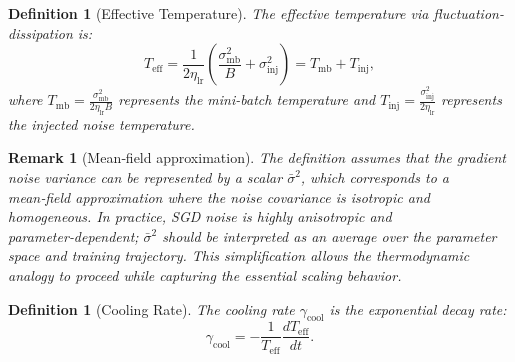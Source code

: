 \documentclass[11pt, a4paper]{article}
\newtheorem{dfn}[theo]{Definition}
\theoremstyle{plain}
\newtheorem*{remark}{Remark}
\begin{document}
\begin{dfn}[Effective Temperature]\label{dfn:teff}
The effective temperature via fluctuation-dissipation is:
\begin{equation}
T_{\text{eff}} = \frac{1}{2\eta_{\text{lr}}}\left(\frac{\sigma_{\text{mb}}^2}{B} + \sigma_{\text{inj}}^2\right) = T_{\text{mb}} + T_{\text{inj}},
\label{eq:teff}
\end{equation}
where $T_{\text{mb}} = \frac{\sigma_{\text{mb}}^2}{2\eta_{\text{lr}}B}$ represents the mini-batch temperature and $T_{\text{inj}} = \frac{\sigma_{\text{inj}}^2}{2\eta_{\text{lr}}}$ represents the injected noise temperature.
\end{dfn}

\begin{remark}[Mean‑field approximation]
The definition assumes that the gradient noise variance can be represented by a scalar $\bar{\sigma}^2$, which corresponds to a mean‑field approximation where the noise covariance is isotropic and homogeneous. In practice, SGD noise is highly anisotropic and parameter‑dependent; $\bar{\sigma}^2$ should be interpreted as an average over the parameter space and training trajectory. This simplification allows the thermodynamic analogy to proceed while capturing the essential scaling behavior.
\end{remark}

\begin{dfn}[Cooling Rate]\label{dfn:cooling_rate}
The cooling rate $\gamma_{\text{cool}}$ is the exponential decay rate:
\begin{equation}
\gamma_{\text{cool}} = -\frac{1}{T_{\text{eff}}} \frac{dT_{\text{eff}}}{dt}.
\label{eq:gamma_cool}
\end{equation}
\end{dfn}
\end{document}
